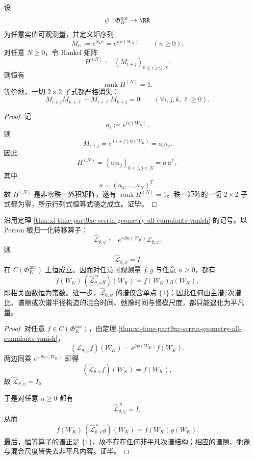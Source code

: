 \begin{theorem}\label{thm:xi-time-part9xc-serrin-hankel-prony-rank-one}
设
\[
\psi:\mathfrak G_K^{\mathrm{nor}}\to\RR
\]
为任意实值可观测量，并定义矩序列
\[
M_n:=e^{S_n\psi}=e^{n\psi(W_K)}
\qquad (n\ge 0).
\]
对任意 \(N\ge 0\)，令 Hankel 矩阵
\[
H^{(N)}:=(M_{i+j})_{0\le i,j\le N}.
\]
则恒有
\[
\operatorname{rank} H^{(N)}=1.
\]
等价地，一切 \(2\times 2\) 子式都严格消失：
\[
M_{i+j}M_{k+\ell}-M_{i+\ell}M_{k+j}=0
\qquad
(\forall i,j,k,\ell\ge 0).
\]
\end{theorem}
\begin{proof}
记
\[
a_i:=e^{i\psi(W_K)}.
\]
则
\[
M_{i+j}=e^{(i+j)\psi(W_K)}=a_i a_j.
\]
因此
\[
H^{(N)}=(a_i a_j)_{0\le i,j\le N}=a\,a^{\mathsf T},
\]
其中
\[
a=(a_0,\dots,a_N)^{\mathsf T}.
\]
故 \(H^{(N)}\) 是非零秩一外积矩阵，遂有 \(\operatorname{rank}H^{(N)}=1\)。秩一矩阵的一切 \(2\times 2\) 子式都为零，所示行列式恒等式随之成立。证毕。
\end{proof}

\begin{proposition}[归一化几何信道的动力学真空]\label{prop:xi-time-part9xc-serrin-normalized-transfer-vacuum}
沿用定理 \ref{thm:xi-time-part9xc-serrin-geometry-all-cumulants-vanish} 的记号。以 Perron 根归一化转移算子：
\[
\widehat{\mathcal L}_{\theta,\psi}
:=
e^{-\theta\psi(W_K)}\mathcal L_{\theta,\psi}.
\]
则
\[
\widehat{\mathcal L}_{\theta,\psi}=I
\]
在 \(C(\mathfrak G_K^{\mathrm{nor}})\) 上恒成立。因而对任意可观测量 \(f,g\) 与任意 \(n\ge 0\)，都有
\[
f(W_K)\,(\widehat{\mathcal L}_{\theta,\psi}^{\,n}g)(W_K)
=
f(W_K)g(W_K),
\]
即相关函数恒为常数。进一步，\(\widehat{\mathcal L}_{\theta,\psi}\) 的谱仅含单点 \(\{1\}\)；因此任何由主谱/次谱比、谱隙或次谱半径构造的混合时间、弛豫时间与慢模尺度，都只能退化为平凡量。
\end{proposition}
\begin{proof}
对任意 \(f\in C(\mathfrak G_K^{\mathrm{nor}})\)，由定理
\ref{thm:xi-time-part9xc-serrin-geometry-all-cumulants-vanish}，
\[
(\mathcal L_{\theta,\psi}f)(W_K)=e^{\theta\psi(W_K)}f(W_K).
\]
两边同乘 \(e^{-\theta\psi(W_K)}\) 即得
\[
(\widehat{\mathcal L}_{\theta,\psi}f)(W_K)=f(W_K),
\]
故 \(\widehat{\mathcal L}_{\theta,\psi}=I\)。

于是对任意 \(n\ge 0\) 都有
\[
\widehat{\mathcal L}_{\theta,\psi}^{\,n}=I,
\]
从而
\[
f(W_K)\,(\widehat{\mathcal L}_{\theta,\psi}^{\,n}g)(W_K)
=
f(W_K)g(W_K).
\]
最后，恒等算子的谱正是 \(\{1\}\)，故不存在任何非平凡次谱结构；相应的谱隙、弛豫与混合尺度皆失去非平凡内容。证毕。
\end{proof}

